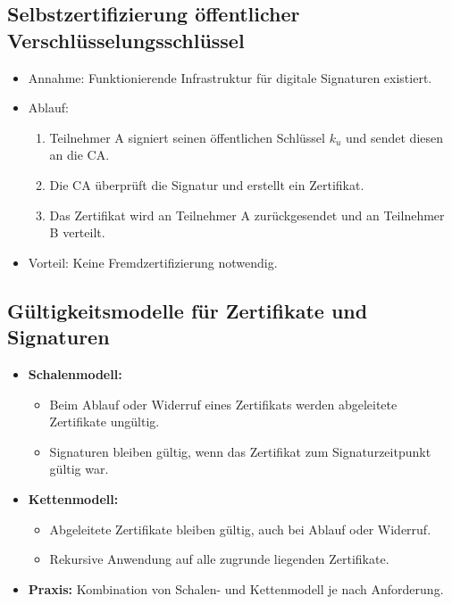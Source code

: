 \documentclass{article}
\begin{document}
\subsection{Selbstzertifizierung öffentlicher Verschlüsselungsschlüssel}
\begin{itemize}
    \item Annahme: Funktionierende Infrastruktur für digitale Signaturen existiert.
    \item Ablauf:
    \begin{enumerate}
        \item Teilnehmer A signiert seinen öffentlichen Schlüssel $k_u$ und sendet diesen an die CA.
        \item Die CA überprüft die Signatur und erstellt ein Zertifikat.
        \item Das Zertifikat wird an Teilnehmer A zurückgesendet und an Teilnehmer B verteilt.
    \end{enumerate}
    \item Vorteil: Keine Fremdzertifizierung notwendig.
\end{itemize}

\subsection{Gültigkeitsmodelle für Zertifikate und Signaturen}
\begin{itemize}
    \item \textbf{Schalenmodell:}
    \begin{itemize}
        \item Beim Ablauf oder Widerruf eines Zertifikats werden abgeleitete Zertifikate ungültig.
        \item Signaturen bleiben gültig, wenn das Zertifikat zum Signaturzeitpunkt gültig war.
    \end{itemize}
    \item \textbf{Kettenmodell:}
    \begin{itemize}
        \item Abgeleitete Zertifikate bleiben gültig, auch bei Ablauf oder Widerruf.
        \item Rekursive Anwendung auf alle zugrunde liegenden Zertifikate.
    \end{itemize}
    \item \textbf{Praxis:} Kombination von Schalen- und Kettenmodell je nach Anforderung.
\end{itemize}


\end{document}
